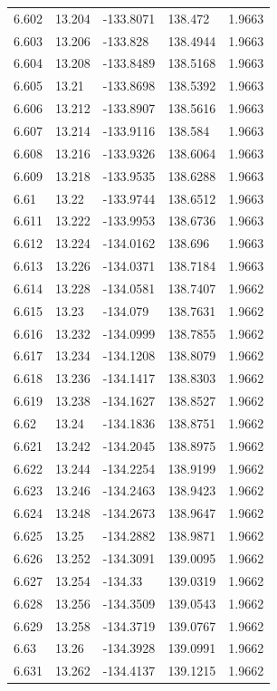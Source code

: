 \begin{tabular}{lllll}
6.602 & 13.204 & -133.8071 & 138.472 & 1.9663 \\
6.603 & 13.206 & -133.828 & 138.4944 & 1.9663 \\
6.604 & 13.208 & -133.8489 & 138.5168 & 1.9663 \\
6.605 & 13.21 & -133.8698 & 138.5392 & 1.9663 \\
6.606 & 13.212 & -133.8907 & 138.5616 & 1.9663 \\
6.607 & 13.214 & -133.9116 & 138.584 & 1.9663 \\
6.608 & 13.216 & -133.9326 & 138.6064 & 1.9663 \\
6.609 & 13.218 & -133.9535 & 138.6288 & 1.9663 \\
6.61 & 13.22 & -133.9744 & 138.6512 & 1.9663 \\
6.611 & 13.222 & -133.9953 & 138.6736 & 1.9663 \\
6.612 & 13.224 & -134.0162 & 138.696 & 1.9663 \\
6.613 & 13.226 & -134.0371 & 138.7184 & 1.9663 \\
6.614 & 13.228 & -134.0581 & 138.7407 & 1.9662 \\
6.615 & 13.23 & -134.079 & 138.7631 & 1.9662 \\
6.616 & 13.232 & -134.0999 & 138.7855 & 1.9662 \\
6.617 & 13.234 & -134.1208 & 138.8079 & 1.9662 \\
6.618 & 13.236 & -134.1417 & 138.8303 & 1.9662 \\
6.619 & 13.238 & -134.1627 & 138.8527 & 1.9662 \\
6.62 & 13.24 & -134.1836 & 138.8751 & 1.9662 \\
6.621 & 13.242 & -134.2045 & 138.8975 & 1.9662 \\
6.622 & 13.244 & -134.2254 & 138.9199 & 1.9662 \\
6.623 & 13.246 & -134.2463 & 138.9423 & 1.9662 \\
6.624 & 13.248 & -134.2673 & 138.9647 & 1.9662 \\
6.625 & 13.25 & -134.2882 & 138.9871 & 1.9662 \\
6.626 & 13.252 & -134.3091 & 139.0095 & 1.9662 \\
6.627 & 13.254 & -134.33 & 139.0319 & 1.9662 \\
6.628 & 13.256 & -134.3509 & 139.0543 & 1.9662 \\
6.629 & 13.258 & -134.3719 & 139.0767 & 1.9662 \\
6.63 & 13.26 & -134.3928 & 139.0991 & 1.9662 \\
6.631 & 13.262 & -134.4137 & 139.1215 & 1.9662 \\

\end{tabular}
